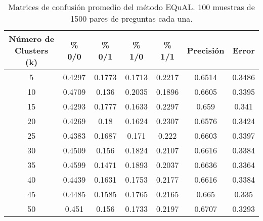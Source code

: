 \begin{table}[]
	\centering
	\begin{tabular}{|c|c|c|c|c|c|c|}
		\hline
		\rowcolor[HTML]{CFE2F3}
		\textbf{Número de Clusters (k)} & \textbf{\% 0/0} & \textbf{\% 0/1} & \textbf{\% 1/0} & \textbf{\% 1/1} & \textbf{Precisión} & \textbf{Error} \\ \hline
		5  & 0.4297 & 0.1773 & 0.1713 & 0.2217 & 0.6514 & 0.3486 \\ \hline
		10 & 0.4709 & 0.136  & 0.2035 & 0.1896 & 0.6605 & 0.3395 \\ \hline
		15 & 0.4293 & 0.1777 & 0.1633 & 0.2297 & 0.659  & 0.341  \\ \hline
		20 & 0.4269 & 0.18   & 0.1624 & 0.2307 & 0.6576 & 0.3424 \\ \hline
		25 & 0.4383 & 0.1687 & 0.171  & 0.222  & 0.6603 & 0.3397 \\ \hline
		30 & 0.4509 & 0.156  & 0.1824 & 0.2107 & 0.6616 & 0.3384 \\ \hline
		35 & 0.4599 & 0.1471 & 0.1893 & 0.2037 & 0.6636 & 0.3364 \\ \hline
		40 & 0.4439 & 0.1631 & 0.1753 & 0.2177 & 0.6616 & 0.3384 \\ \hline
		45 & 0.4485 & 0.1585 & 0.1765 & 0.2165 & 0.665  & 0.335  \\ \hline
		\rowcolor[HTML]{D9EAD3}
		50 & 0.451  & 0.156  & 0.1733 & 0.2197 & 0.6707 & 0.3293 \\ \hline
	\end{tabular}
	\caption{Matrices de confusión promedio del método EQuAL. 100 muestras de 1500 pares de preguntas cada una. }
	\label{tab:analisis-100-1500}
\end{table}

